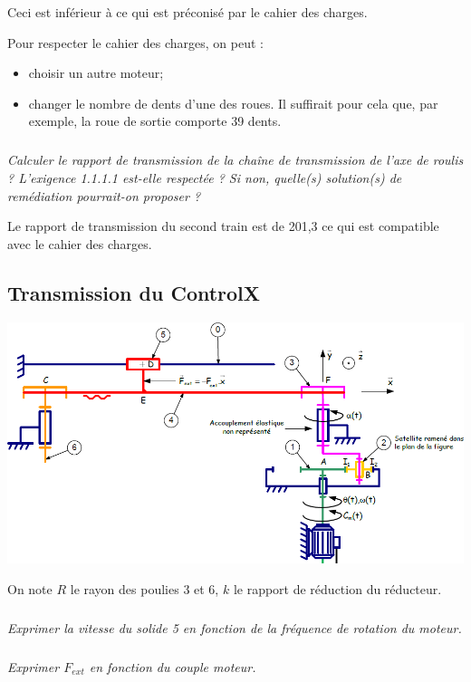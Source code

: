 \documentclass[10pt,fleqn]{article} %
\begin{document}
\begin{multicols}{2}
\begin{corrige}
Ceci est inférieur à ce qui est préconisé par le cahier des charges. 

Pour respecter le cahier des charges, on peut :
\begin{itemize}
\item choisir un autre moteur;
\item changer le nombre de dents d'une des roues. Il suffirait pour cela que,  par exemple, la roue de sortie comporte 39 dents. 
\end{itemize}
\end{corrige}
\else
\fi

\subparagraph{}
\textit{Calculer le rapport de transmission de la chaîne de transmission de l'axe de roulis ? L'exigence 1.1.1.1 est-elle respectée ? Si non, quelle(s) solution(s) de remédiation pourrait-on proposer ?}
\ifprof
\begin{corrige}
Le rapport de transmission du second train est de 201,3 ce qui est compatible avec le cahier des charges.
\end{corrige}
\else
\fi


\subsection*{Transmission du ControlX}
\begin{center}
\includegraphics[width=\linewidth]{images/controlx}
\end{center}

On note $R$ le rayon des poulies 3 et 6, $k$ le rapport de réduction du réducteur.

\subparagraph*{}
\textit{Exprimer la vitesse du solide 5 en fonction de la fréquence de rotation du moteur.}
\ifprof
\begin{corrige}
\end{corrige}
\else
\fi
\subparagraph*{}
\textit{Exprimer $F_{ext}$ en fonction du couple moteur.}
\ifprof
\begin{corrige}
\end{corrige}
\else
\fi




\end{multicols}
\end{document}
